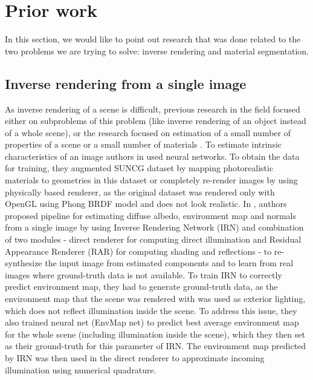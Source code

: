 \chapter{Prior work}
\label{kap:prior}

In this section, we would like to point out research that was done related to the two problems we are trying to solve: inverse rendering and material segmentation.

\section{Inverse rendering from a single image}
As inverse rendering of a scene is difficult, previous research in the field focused either on subproblems of this problem (like inverse rendering of an object instead of a whole scene), or the research focused on estimation of a small number of properties of a scene \cite{li-inverse-rendering} \cite{sengupta-inverse-rendering} or a small number of materials \cite{material-recognition}.
\newline
To estimate intrinsic characteristics of an image authors in \cite{li-inverse-rendering} \cite{sengupta-inverse-rendering} used neural networks. To obtain the data for training, they augmented SUNCG dataset \cite{song2016ssc} by mapping photorealistic materials to geometries in this dataset or completely re-render images by using physically based renderer, as the original dataset was rendered only with OpenGL using Phong BRDF model and does not look realistic.
\newline
In \cite{sengupta-inverse-rendering}, authors proposed pipeline for estimating diffuse albedo, environment map and normals from a single image by using Inverse Rendering Network (IRN) and combination of two modules - direct renderer for computing direct illumination and Residual Appearance Renderer (RAR) for computing shading and reflections - to re-synthesize the input image from estimated components and to learn from real images where ground-truth data is not available. To train IRN to correctly predict environment map, they had to generate ground-truth data, as the environment map that the scene was rendered with was used as exterior lighting, which does not reflect illumination inside the scene. To address this issue, they also trained neural net (EnvMap net) to predict best average environment map for the whole scene (including illumination inside the scene), which they then set as their ground-truth for this parameter of IRN. The environment map predicted by IRN was then used in the direct renderer to approximate incoming illumination using numerical quadrature.
